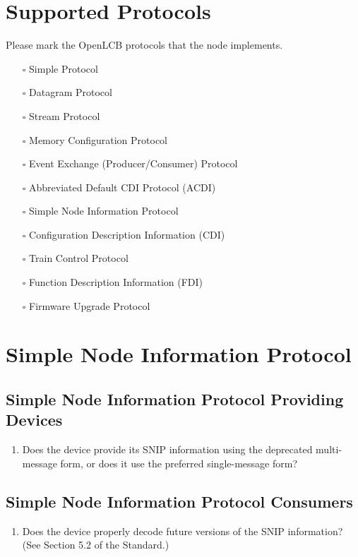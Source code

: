 \section{Supported Protocols}
    Please mark the OpenLCB protocols that the node implements.
    \begin{itemize}
        \item[$\square$] Simple Protocol
        \item[$\square$] Datagram Protocol
        \item[$\square$] Stream Protocol
        \item[$\square$] Memory Configuration Protocol
        \item[$\square$] Event Exchange (Producer/Consumer) Protocol
        \item[$\square$] Abbreviated Default CDI Protocol (ACDI)
        \item[$\square$] Simple Node Information Protocol 
        \item[$\square$] Configuration Description Information (CDI) 
        \item[$\square$] Train Control Protocol 
        \item[$\square$] Function Description Information (FDI) 
        \item[$\square$] Firmware Upgrade Protocol 
    \end{itemize}

\section{Simple Node Information Protocol}
    \subsection{Simple Node Information Protocol Providing Devices}
        \begin{enumerate}
            \item Does the device provide its SNIP information using
                the deprecated multi-message form, or does it use
                the preferred single-message form?
        \end{enumerate}
    \subsection{Simple Node Information Protocol Consumers}
        \begin{enumerate}
            \item Does the device properly decode future versions of the SNIP
                information? (See Section 5.2 of the Standard.)
        \end{enumerate}

